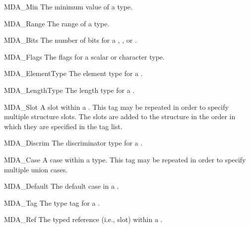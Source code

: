 \begin{cprototypelist}
\begin{cprototypelist}
\begin{cidentifierlist}
      \item[MDA_Min]
       The minimum value of a  type.

      \item[MDA_Range]
       The range of a  type.

      \item[MDA_Bits]
       The number of bits for a ,
      , or \@.

      \item[MDA_Flags]
       The flags
      for a scalar or character type.

      \item[MDA_ElementType]
       The element type for a \@.

      \item[MDA_LengthType]
       The length type for a \@.

      \item[MDA_Slot]
       A slot within a \@.  This
      tag may be repeated in order to specify multiple structure slots.  The
      slots are added to the structure in the order in which they are specified
      in the tag list.

      \item[MDA_Discrim]
       The discriminator type for a
      \@.

      \item[MDA_Case]
       A case within a
       type.  This tag may be repeated in order to specify
      multiple union cases.

      \item[MDA_Default]
       The default case in a \@.

      \item[MDA_Tag]
       The type tag for a \@.

      \item[MDA_Ref]
       The typed reference (i.e.,  slot)
      within a \@.


\end{cidentifierlist}
\end{cprototypelist}
\end{cprototypelist}
